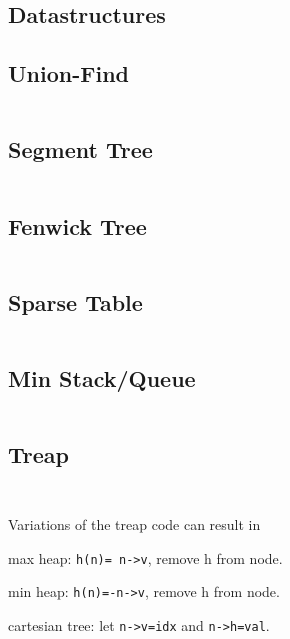 \documentclass[8pt,a4paper,landscape,oneside]{amsart}
\newenvironment{itemize_compact}
{ \begin{itemize}[leftmargin=.5cm]
    \setlength{\itemsep}{0pt}
    \setlength{\parskip}{0pt}
    \setlength{\parsep}{0pt}     }
{ \end{itemize}                  }
\begin{document}
	\newpage
	\begin{multicols*}{4}		
		\section{Datastructures}
		\subsection{Union-Find}
		\inputminted[firstline=9,lastline=19]{c++}{_code/datastructures/union_find.cpp}
		\subsection{Segment Tree}
		\inputminted[firstline=14,lastline=52]{c++}{_code/datastructures/segment_tree.cpp}
		\vfill\null
		\columnbreak
		\subsection{Fenwick Tree}
		\inputminted[firstline=14,lastline=32]{c++}{_code/datastructures/fenwick_tree.cpp}
		\subsection{Sparse Table}
		\inputminted[firstline=15,lastline=23]{c++}{_code/datastructures/sparse_table.cpp}
		\subsection{Min Stack/Queue}
		\inputminted[firstline=15,lastline=35]{c++}{_code/datastructures/min_queue.cpp}
		\vfill\null
		\columnbreak
		\subsection{Treap}
		\inputminted[firstline=16,lastline=67]{c++}{_code/datastructures/treap.cpp}
		\vfill\null
		\columnbreak
		\inputminted[firstline=68,lastline=115]{c++}{_code/datastructures/treap.cpp}
		\noindent
		Variations of the treap code can result in
		\begin{itemize_compact}
			\item max heap: \texttt{h(n)= n->v}, remove h from node.
			\item min heap: \texttt{h(n)=-n->v}, remove h from node.
			\item cartesian tree: let \texttt{n->v=idx} and \texttt{n->h=val}.
		\end{itemize_compact}
		\vfill\null
	\end{multicols*}
\end{document}
